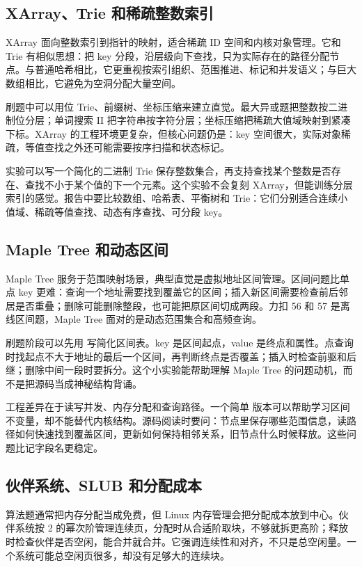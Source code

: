 \subsection{XArray、Trie 和稀疏整数索引}

XArray 面向整数索引到指针的映射，适合稀疏 ID 空间和内核对象管理。它和 Trie 有相似思想：把 key 分段，沿层级向下查找，只为实际存在的路径分配节点。与普通哈希相比，它更重视按索引组织、范围推进、标记和并发语义；与巨大数组相比，它避免为空洞分配大量空间。

刷题中可以用位 Trie、前缀树、坐标压缩来建立直觉。最大异或题把整数按二进制位分层；单词搜索 II 把字符串按字符分层；坐标压缩把稀疏大值域映射到紧凑下标。XArray 的工程环境更复杂，但核心问题仍是：key 空间很大，实际对象稀疏，等值查找之外还可能需要按序扫描和状态标记。

实验可以写一个简化的二进制 Trie 保存整数集合，再支持查找某个整数是否存在、查找不小于某个值的下一个元素。这个实验不会复刻 XArray，但能训练分层索引的感觉。报告中要比较数组、哈希表、平衡树和 Trie：它们分别适合连续小值域、稀疏等值查找、动态有序查找、可分段 key。

\subsection{Maple Tree 和动态区间}

Maple Tree 服务于范围映射场景，典型直觉是虚拟地址区间管理。区间问题比单点 key 更难：查询一个地址需要找到覆盖它的区间；插入新区间需要检查前后邻居是否重叠；删除可能删除整段，也可能把原区间切成两段。力扣 56 和 57 是离线区间题，Maple Tree 面对的是动态范围集合和高频查询。

刷题阶段可以先用  写简化区间表。key 是区间起点，value 是终点和属性。点查询时找起点不大于地址的最后一个区间，再判断终点是否覆盖；插入时检查前驱和后继；删除中间一段时要拆分。这个小实验能帮助理解 Maple Tree 的问题动机，而不是把源码当成神秘结构背诵。

工程差异在于读写并发、内存分配和查询路径。一个简单  版本可以帮助学习区间不变量，却不能替代内核结构。源码阅读时要问：节点里保存哪些范围信息，读路径如何快速找到覆盖区间，更新如何保持相邻关系，旧节点什么时候释放。这些问题比记字段名更稳定。

\subsection{伙伴系统、SLUB 和分配成本}

算法题通常把内存分配当成免费，但 Linux 内存管理会把分配成本放到中心。伙伴系统按 2 的幂次阶管理连续页，分配时从合适阶取块，不够就拆更高阶；释放时检查伙伴是否空闲，能合并就合并。它强调连续性和对齐，不只是总空闲量。一个系统可能总空闲页很多，却没有足够大的连续块。

